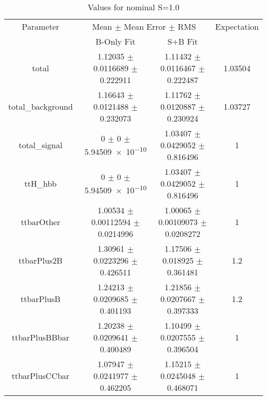 \begin{table}
\centering
\caption{Values for nominal S=1.0}
\begin{tabular}{cccc}
\toprule
Parameter & \multicolumn{2}{c}{Mean $\pm$ Mean Error $\pm$ RMS} & Expectation\\
 & B-Only Fit & S+B Fit & \\
\midrule
total & \num{1.12035} $\pm$ \num{0.0116689} $\pm$ \num{0.222911} & \num{1.11432} $\pm$ \num{0.0116467} $\pm$ \num{0.222487} & \num{1.03504}\\
total\_background & \num{1.16643} $\pm$ \num{0.0121488} $\pm$ \num{0.232073} & \num{1.11762} $\pm$ \num{0.0120887} $\pm$ \num{0.230924} & \num{1.03727}\\
total\_signal & \num{0} $\pm$ \num{0} $\pm$ \num{5.94509e-10} & \num{1.03407} $\pm$ \num{0.0429052} $\pm$ \num{0.816496} & \num{1}\\
ttH\_hbb & \num{0} $\pm$ \num{0} $\pm$ \num{5.94509e-10} & \num{1.03407} $\pm$ \num{0.0429052} $\pm$ \num{0.816496} & \num{1}\\
ttbarOther & \num{1.00534} $\pm$ \num{0.00112594} $\pm$ \num{0.0214996} & \num{1.00065} $\pm$ \num{0.00109073} $\pm$ \num{0.0208272} & \num{1}\\
ttbarPlus2B & \num{1.30961} $\pm$ \num{0.0223296} $\pm$ \num{0.426511} & \num{1.17506} $\pm$ \num{0.018925} $\pm$ \num{0.361481} & \num{1.2}\\
ttbarPlusB & \num{1.24213} $\pm$ \num{0.0209685} $\pm$ \num{0.401193} & \num{1.21856} $\pm$ \num{0.0207667} $\pm$ \num{0.397333} & \num{1.2}\\
ttbarPlusBBbar & \num{1.20238} $\pm$ \num{0.0209641} $\pm$ \num{0.400489} & \num{1.10499} $\pm$ \num{0.0207555} $\pm$ \num{0.396504} & \num{1}\\
ttbarPlusCCbar & \num{1.07947} $\pm$ \num{0.0241977} $\pm$ \num{0.462205} & \num{1.15215} $\pm$ \num{0.0245048} $\pm$ \num{0.468071} & \num{1}\\
\bottomrule
\end{tabular}
\end{table}